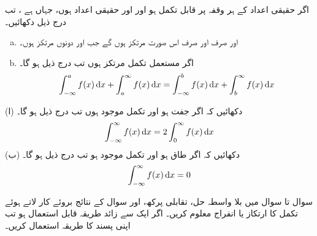 اگر حقیقی اعداد کے ہر وقفہ پر  قابل تکمل ہو اور  اور  حقیقی اعداد ہوں،  جہاں  ہے ، تب  درج ذیل دکھائیں۔
\begin{enumerate}[a.]
\item
{} اور  صرف اور صرف اس صورت مرتکز ہوں گے جب  اور  دونوں مرتکز ہوں۔
\item
اگر مستعمل تکمل مرتکز ہوں تب درج ذیل ہو گا۔
\begin{align*}
\int_{-\infty}^af(x)\dif x+\int_a^{\infty}f(x)\dif x=\int_{-\infty}^bf(x)\dif x+\int_b^{\infty}f(x)\dif x
\end{align*}
\end{enumerate}
(ا) دکھائیں کہ اگر  جفت ہو اور تکمل موجود ہوں تب درج ذیل ہو گا۔
\begin{align*}
\int_{-\infty}^{\infty}f(x)\dif x=2\int_0^{\infty}f(x)\dif x
\end{align*}
(ب) دکھائیں کہ اگر  طاق ہو اور تکمل موجود ہو تب درج ذیل ہو گا۔
\begin{align*}
\int_{-\infty}^{\infty}f(x)\dif x=0
\end{align*}

سوال تا سوال  میں بلا واسطہ حل، تقابلی پرکھ،  اور سوال  کے نتائج بروئے کار لاتے ہوئے  تکمل کا  ارتکاز یا انفراج معلوم کریں۔ اگر ایک سے زائد طریقہ قابل استعمال ہو  تب اپنی پسند کا طریقہ استعمال کریں۔

